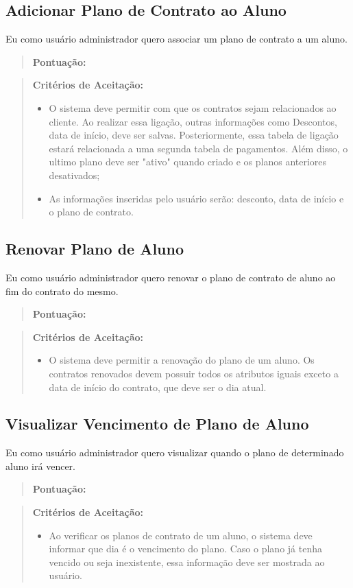 \subsection[Adicionar Plano de Contrato ao Aluno]{Adicionar Plano de Contrato ao Aluno}
Eu como usuário administrador quero associar um plano de contrato a um aluno.
\begin{quote}
    \textbf{Pontuação:}
\end{quote}
\begin{quote}
\textbf{Critérios de Aceitação:}
    \begin{itemize}
        \item O sistema deve permitir com que os contratos sejam relacionados ao cliente. Ao realizar essa ligação, outras informações como Descontos, data de início, deve ser salvas. Posteriormente, essa tabela de ligação estará relacionada a uma segunda tabela de pagamentos. Além disso, o ultimo plano deve ser "ativo" quando criado e os planos anteriores desativados;
        \item As informações inseridas pelo usuário serão: desconto, data de início e o plano de contrato.
    \end{itemize}
\end{quote}

\subsection[Renovar Plano de Aluno]{Renovar Plano de Aluno}
Eu como usuário administrador quero renovar o plano de contrato de aluno ao fim do contrato do mesmo.
\begin{quote}
    \textbf{Pontuação:}
\end{quote}
\begin{quote}
\textbf{Critérios de Aceitação:}
    \begin{itemize}
        \item O sistema deve permitir a renovação do plano de um aluno.  Os contratos renovados devem possuir todos os atributos iguais exceto a data de início do contrato, que deve ser o dia atual.
    \end{itemize}
\end{quote}

\subsection[Visualizar Vencimento de Plano de Aluno]{Visualizar Vencimento de Plano de Aluno}
Eu como usuário administrador quero visualizar quando o plano de determinado
aluno irá vencer.
\begin{quote}
    \textbf{Pontuação:}
\end{quote}
\begin{quote}
\textbf{Critérios de Aceitação:}
    \begin{itemize}
        \item Ao verificar os planos de contrato de um aluno, o sistema deve informar que dia é o vencimento do plano. Caso o plano já tenha vencido ou seja inexistente, essa informação deve ser mostrada ao usuário.
    \end{itemize}
\end{quote}

